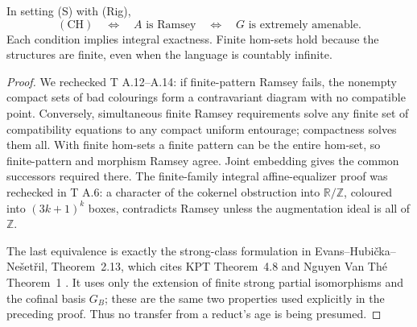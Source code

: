 \begin{theorem}
\label{A:compact-ramsey}
In setting (S) with (Rig),
\[
 \mathrm{(CH)}\quad\Longleftrightarrow\quad A\text{ is Ramsey}
 \quad\Longleftrightarrow\quad G\text{ is extremely amenable}.
\]
Each condition implies integral exactness. Finite hom-sets hold
because the structures are finite, even when the language is
countably infinite.
\end{theorem}
\begin{proof}
We rechecked T A.12--A.14: if finite-pattern Ramsey fails, the
nonempty compact sets of bad colourings form a contravariant
diagram with no compatible point. Conversely, simultaneous finite
Ramsey requirements solve any finite set of compatibility equations
to any compact uniform entourage; compactness solves them all.
With finite hom-sets a finite pattern can be the entire hom-set,
so finite-pattern and morphism Ramsey agree. Joint embedding gives
the common successors required there. The finite-family integral
affine-equalizer proof was rechecked in T A.6: a character of the
cokernel obstruction into $\mathbb R/\mathbb Z$, coloured into
$(3k+1)^k$ boxes, contradicts Ramsey unless the augmentation ideal
is all of $\mathbb Z$.

The last equivalence is exactly the strong-class formulation in
Evans--Hubi\v cka--Ne\v set\v ril, Theorem~2.13, which cites KPT
Theorem~4.8 and Nguyen Van Th\'e Theorem~1
\cite{ABEHN2019,ABKPT2005}. It uses only the extension of finite
strong partial isomorphisms and the cofinal basis $G_B$; these are
the same two properties used explicitly in the preceding proof.
Thus no transfer from a reduct's age is being presumed.
\end{proof}

